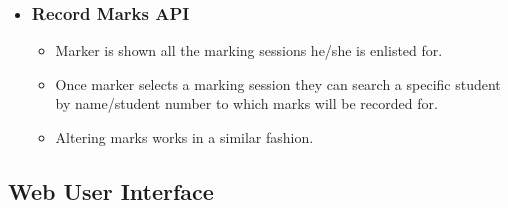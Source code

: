 \documentclass[10pt,a4paper]{article}
\begin{document}
\begin{itemize}
		
		\item \subsubsection*{Record Marks API}
		\begin{itemize}
			\item Marker is shown all the marking sessions he/she is enlisted for.
			\item Once marker selects a marking session they can search a specific student by name/student number to which marks will be recorded for.
			\item Altering marks works in a similar fashion.
		\end{itemize}
	\end{itemize}
	\subsection*{Web User Interface}
\end{document}
